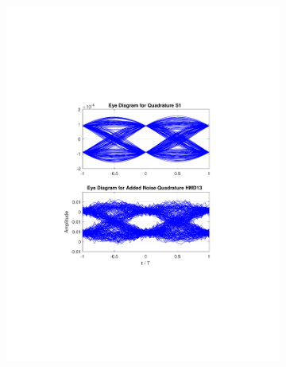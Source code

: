 \begin{refsection}
\begin{figure}[H]
\begin{minipage}{\linewidth}
\begin{subfigure}{.45\textwidth}
	\end{subfigure}
	\begin{subfigure}{.45\textwidth}
		\centering
		\includegraphics[clip, trim=5cm 7cm 5cm 7cm, width=\textwidth]{./sdf/m_qam_system/figures/eyes/q_n_nmf_45_60_rc.pdf}
	\end{subfigure}
	

\end{minipage}
\end{figure}
\end{refsection}
